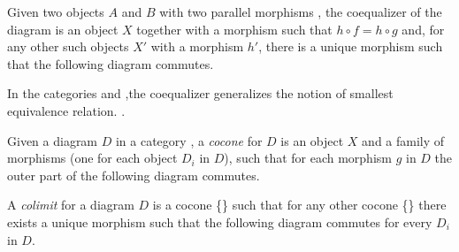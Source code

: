 \begin{definition}[Coequalizer] Given two objects $A$ and $B$ with two parallel morphisms  , the coequalizer of the diagram is an object $X$ together with a morphism  such that \mbox{$h \circ f = h \circ g$} and, for any other such objects $X'$ with a morphism $h'$, there is a unique morphism  such that the following diagram commutes.

\end{definition}

\begin{example} In the categories  and  ,the coequalizer generalizes the notion of smallest equivalence relation. .
\end{example}

\begin{definition}[Colimit] Given a diagram $D$ in a category , a \emph{cocone} for $D$ is an object $X$ and a family of morphisms  (one for each object $D_i$ in $D$), such that for each morphism $g$ in $D$ the outer part of the following diagram commutes.

\hfill

  A \emph{colimit} for a diagram $D$ is a cocone \{\} such that for any other cocone \{\} there exists a unique morphism  such that the following diagram commutes for every $D_i$ in $D$.


\end{definition}

\begin{example}
\end{example}

